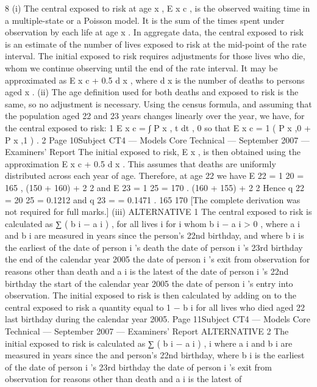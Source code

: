 \documentclass[a4paper,12pt]{article}
\begin{document}
\begin{enumerate}
8
(i)
The central exposed to risk at age x , E x c , is the observed waiting time in a
multiple-state or a Poisson model. It is the sum of the times spent under
observation by each life at age x .
In aggregate data, the central exposed to risk is an estimate of the number of
lives exposed to risk at the mid-point of the rate interval.
The initial exposed to risk requires adjustments for those lives who die, whom
we continue observing until the end of the rate interval.
It may be approximated as E x c + 0.5 d x , where d x is the number of deaths to
persons aged x .
(ii)
The age definition used for both deaths and exposed to risk is the same, so no
adjustment is necessary.
Using the census formula, and assuming that the population aged 22 and 23
years changes linearly over the year, we have, for the central exposed to risk:
1
E x c = ∫ P x , t dt ,
0
so that
E x c =
1
( P x ,0 + P x ,1 ) .
2
Page 10Subject CT4 — Models Core Technical — September 2007 — Examiners’ Report
The initial exposed to risk, E x , is then obtained using the approximation
E x c + 0.5 d x .
This assumes that deaths are uniformly distributed across each year of age.
Therefore, at age 22 we have
E 22 =
1
20
= 165 ,
(150 + 160) +
2
2
and
E 23 =
1
25
= 170 .
(160 + 155) +
2
2
Hence q 22 =
20
25
= 0.1212 and q 23 =
= 0.1471 .
165
170
[The complete derivation was not required for full marks.]
(iii)
ALTERNATIVE 1
The central exposed to risk is calculated as
∑ ( b i − a i ) , for all lives i for
i
whom b i − a i > 0 ,
where a i and b i are measured in years since the person’s 22nd birthday, and
where b i is the earliest of
the date of person i ’s death
the date of person i ’s 23rd birthday
the end of the calendar year 2005
the date of person i ’s exit from observation for reasons
other than death
and a i is the latest of
the date of person i ’s 22nd birthday
the start of the calendar year 2005
the date of person i ’s entry into observation.
The initial exposed to risk is then calculated by adding on to the central
exposed to risk a quantity equal to 1 − b i for all lives who died aged 22 last
birthday during the calendar year 2005.
Page 11Subject CT4 — Models Core Technical — September 2007 — Examiners’ Report
ALTERNATIVE 2
The initial exposed to risk is calculated as
∑ ( b i − a i ) ,
i
where a i and b i are measured in years since the
and
person’s 22nd birthday,
where b i is the earliest of
the date of person i ’s 23rd birthday
the date of person i ’s exit from observation for reasons other than death
and a i is the latest of

\end{enumerate}
\end{document}
